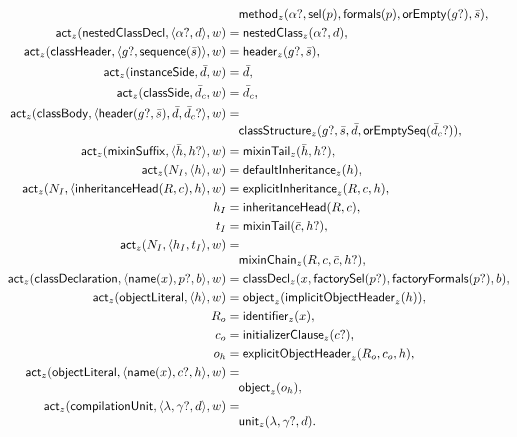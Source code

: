 \begin{equation}
\begin{aligned}
 &\quad\mathsf{method}_{z}(\alpha?,\mathsf{sel}(p),
      \mathsf{formals}(p),\mathsf{orEmpty}(g?),\bar s),\\
 \mathsf{act}_{z}(\mathsf{nestedClassDecl},\langle\alpha?,d\rangle,w)&=
      \mathsf{nestedClass}_{z}(\alpha?,d),\\
 \mathsf{act}_{z}(\mathsf{classHeader},
      \langle g?,\mathsf{sequence}(\bar s)\rangle,w)&=
      \mathsf{header}_{z}(g?,\bar s),\\
 \mathsf{act}_{z}(\mathsf{instanceSide},\bar d,w)&=\bar d,\\
 \mathsf{act}_{z}(\mathsf{classSide},\bar d_c,w)&=\bar d_c,\\
 \mathsf{act}_{z}(\mathsf{classBody},
      \langle\mathsf{header}(g?,\bar s),\bar d,\bar d_c?\rangle,w)&=\\[-1mm]
 &\quad\mathsf{classStructure}_{z}
      (g?,\bar s,\bar d,\mathsf{orEmptySeq}(\bar d_c?)),\\
 \mathsf{act}_{z}(\mathsf{mixinSuffix},\langle\bar h,h?\rangle,w)&=
      \mathsf{mixinTail}_{z}(\bar h,h?),\\
 \mathsf{act}_{z}(N_I,\langle h\rangle,w)&=
      \mathsf{defaultInheritance}_{z}(h),\\
 \mathsf{act}_{z}(N_I,
      \langle\mathsf{inheritanceHead}(R,c),h\rangle,w)&=
      \mathsf{explicitInheritance}_{z}(R,c,h),\\
 h_I&=\mathsf{inheritanceHead}(R,c),\\
 t_I&=\mathsf{mixinTail}(\bar c,h?),\\
 \mathsf{act}_{z}(N_I,\langle h_I,t_I\rangle,w)&=\\[-1mm]
 &\quad\mathsf{mixinChain}_{z}(R,c,\bar c,h?),\\
 \mathsf{act}_{z}(\mathsf{classDeclaration},
      \langle\mathsf{name}(x),p?,b\rangle,w)&=
      \mathsf{classDecl}_{z}(x,\mathsf{factorySel}(p?),
         \mathsf{factoryFormals}(p?),b),\\
 \mathsf{act}_{z}(\mathsf{objectLiteral},\langle h\rangle,w)&=
      \mathsf{object}_{z}(\mathsf{implicitObjectHeader}_{z}(h)),\\
 R_o&=\mathsf{identifier}_{z}(x),\\
 c_o&=\mathsf{initializerClause}_{z}(c?),\\
 o_h&=\mathsf{explicitObjectHeader}_{z}(R_o,c_o,h),\\
 \mathsf{act}_{z}(\mathsf{objectLiteral},
      \langle\mathsf{name}(x),c?,h\rangle,w)&=\\[-1mm]
 &\quad\mathsf{object}_{z}(o_h),\\
 \mathsf{act}_{z}(\mathsf{compilationUnit},
      \langle\lambda,\gamma?,d\rangle,w)&=\\[-1mm]
 &\quad\mathsf{unit}_{z}(\lambda,\gamma?,d).
\end{aligned}
\end{equation}
